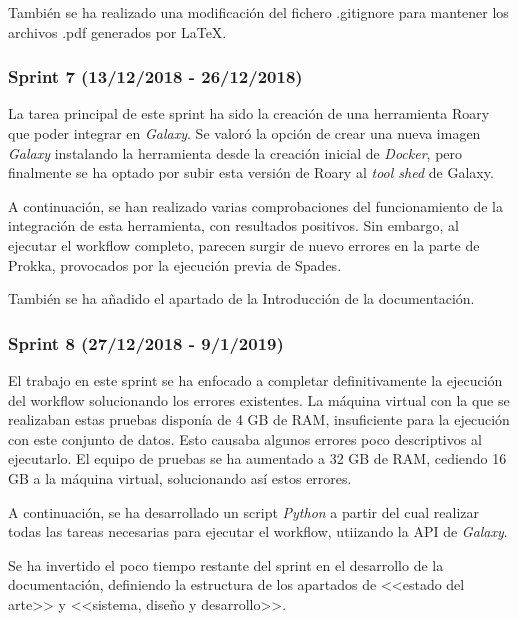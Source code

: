 También se ha realizado una modificación del fichero .gitignore para mantener los archivos .pdf generados por \LaTeX.

\subsubsection{Sprint 7 (13/12/2018 - 26/12/2018)}
La tarea principal de este sprint ha sido la creación de una herramienta Roary que poder integrar en \textit{Galaxy}. Se valoró la opción de crear una nueva imagen \textit{Galaxy} instalando la herramienta desde la creación inicial de \textit{Docker}, pero finalmente se ha optado por subir esta versión de Roary al \emph{tool shed} de Galaxy.

A continuación, se han realizado varias comprobaciones del funcionamiento de la integración de esta herramienta, con resultados positivos. Sin embargo, al ejecutar el workflow completo, parecen surgir de nuevo errores en la parte de Prokka, provocados por la ejecución previa de Spades. 

También se ha añadido el apartado de la Introducción de la documentación.

\subsubsection{Sprint 8 (27/12/2018 - 9/1/2019)}
El trabajo en este sprint se ha enfocado a completar definitivamente la ejecución del workflow solucionando los errores existentes. La máquina virtual con la que se realizaban estas pruebas disponía de 4 GB de RAM, insuficiente para la ejecución con este conjunto de datos. Esto causaba algunos errores poco descriptivos al ejecutarlo. El equipo de pruebas se ha aumentado a 32 GB de RAM, cediendo 16 GB a la máquina virtual, solucionando así estos errores.

A continuación, se ha desarrollado un script \textit{Python} a partir del cual realizar todas las tareas necesarias para ejecutar el workflow, utiizando la API de \textit{Galaxy}.

Se ha invertido el poco tiempo restante del sprint en el desarrollo de la documentación, definiendo la estructura de los apartados de <<estado del arte>> y <<sistema, diseño y desarrollo>>.
\newpage \thispagestyle{empty} %